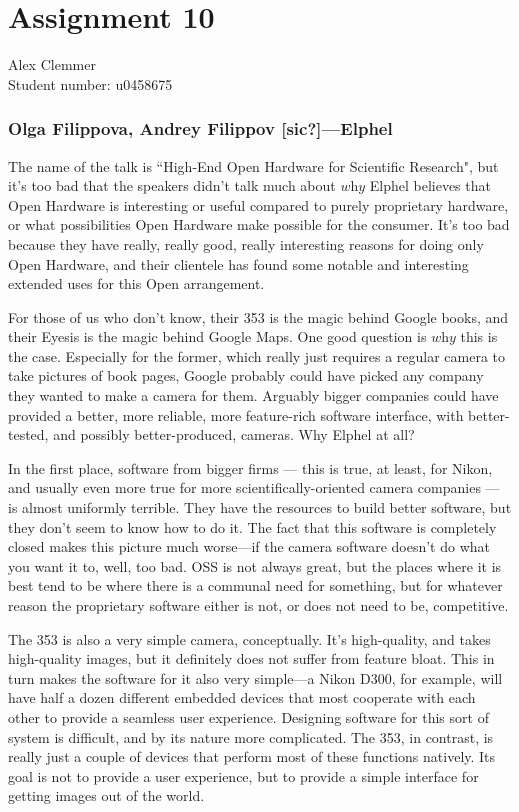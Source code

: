 \documentclass[a4paper]{article}
\begin{document}
\section*{Assignment 10}
Alex Clemmer \\
Student number: u0458675

\subsubsection*{Olga Filippova, Andrey Filippov [sic?]---Elphel}

The name of the talk is ``High-End Open Hardware for Scientific Research", but it's too bad that the speakers didn't talk much about $\textit{why}$ Elphel believes that Open Hardware is interesting or useful compared to purely proprietary hardware, or what possibilities Open Hardware make possible for the consumer. It's too bad because they have really, really good, really interesting reasons for doing only Open Hardware, and their clientele has found some notable and interesting extended uses for this Open arrangement.

For those of us who don't know, their 353 is the magic behind Google books, and their Eyesis is the magic behind Google Maps. One good question is $\textit{why}$ this is the case. Especially for the former, which really just requires a regular camera to take pictures of book pages, Google probably could have picked any company they wanted to make a camera for them. Arguably bigger companies could have provided a better, more reliable, more feature-rich software interface, with better-tested, and possibly better-produced, cameras. Why Elphel at all?

In the first place, software from bigger firms --- this is true, at least, for Nikon, and usually even more true for more scientifically-oriented camera companies --- is almost uniformly terrible. They have the resources to build better software, but they don't seem to know how to do it. The fact that this software is completely closed makes this picture much worse---if the camera software doesn't do what you want it to, well, too bad. OSS is not always great, but the places where it is best tend to be where there is a communal need for something, but for whatever reason the proprietary software either is not, or does not need to be, competitive.

The 353 is also a very simple camera, conceptually. It's high-quality, and takes high-quality images, but it definitely does not suffer from feature bloat. This in turn makes the software for it also very simple---a Nikon D300, for example, will have half a dozen different embedded devices that most cooperate with each other to provide a seamless user experience. Designing software for this sort of system is difficult, and by its nature more complicated. The 353, in contrast, is really just a couple of devices that perform most of these functions natively. Its goal is not to provide a user experience, but to provide a simple interface for getting images out of the world.
\end{document}
